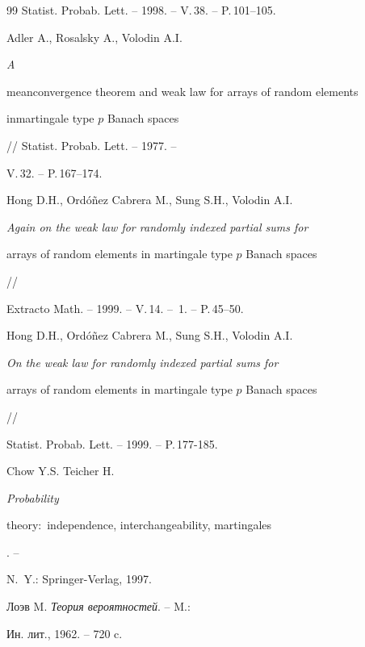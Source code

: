 \begin{thebibliography}{99}
Statist. Probab. Lett. -- 1998. -- V.\,38. -- P.\,101--105.




Adler A., Rosalsky A., Volodin A.I. {\em A


meanconvergence theorem and weak law for arrays of random elements


inmartingale type $p$ Banach spaces} // Statist. Probab. Lett. -- 1977. --


V.\,32. -- P.\,167--174.




Hong D.H., Ord\'o\~nez Cabrera M., Sung S.H., Volodin A.I.


{\em Again on the weak law for randomly indexed partial sums for


arrays of random elements in martingale type $p$ Banach spaces} //


Extracto Math. -- 1999. -- V.\,14. -- \No\,1. -- P.\,45--50.




Hong D.H., Ord\'o\~nez Cabrera M., Sung S.H., Volodin A.I.


{\em On the weak law for randomly indexed partial sums for


arrays of random elements in martingale type $p$ Banach spaces} //


Statist. Probab. Lett. -- 1999. -- P.\,177-185.




Chow Y.S. Teicher H. {\em Probability


theory$:$ independence, interchangeability, martingales}. --


N.~Y.: Springer-Verlag, 1997.




Лоэв M. {\em Теория вероятностей}. -- M.:


Ин. лит., 1962. -- 720 c.





\end{thebibliography}





\vskip 2cm












\label{end}











